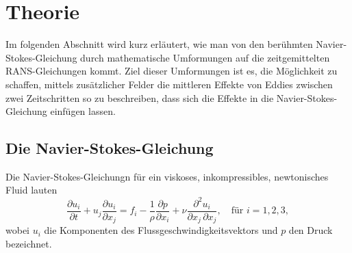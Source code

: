 %
%
%
%
\section{Theorie\label{reynolds:section:teil0}}
%
Im folgenden Abschnitt wird kurz erläutert, wie man von den berühmten Navier-Stokes-Gleichung
%
durch mathematische Umformungen auf die zeitgemittelten RANS-Gleichun\-gen kommt.
%
%
Ziel dieser Umformungen ist es, die Möglichkeit zu schaffen, mittels zusätzlicher Felder
die mittleren Effekte von Eddies zwischen zwei Zeitschritten so zu beschreiben, dass sich die
Effekte in die Navier-Stokes-Gleichung einfügen lassen.
%
\subsection{Die Navier-Stokes-Gleichung}
%
Die Navier-Stokes-Gleichungn für ein viskoses, inkompressibles, newtonisches Fluid lauten
%
%
%
%
\begin{equation}
    \label{reynolds:eqs:impulse}
    \frac{\partial u_i}{\partial t} + u_j \frac{\partial u_i}{\partial x_j} =
        f_i - \frac{1}{\rho} \frac{\partial p}{\partial x_i} + 
        \nu \frac{\partial^2 u_i}{\partial x_j\, \partial x_j},\quad\text{für $i = 1,2,3$},
\end{equation}
%
wobei $u_i$ die Komponenten des Flussgeschwindigkeitsvektors und $p$ den Druck bezeichnet.

